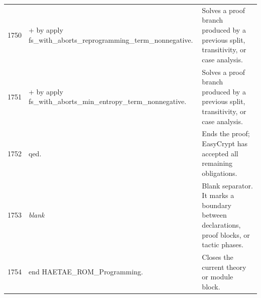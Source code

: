 \documentclass[10pt]{article}
\begin{document}
\begin{longtable}{r L{0.53\textwidth} L{0.37\textwidth}}
1750 & {\ttfamily\scriptsize + by apply fs\_with\_aborts\_reprogramming\_term\_nonnegative.} & Solves a proof branch produced by a previous split, transitivity, or case analysis. \\
1751 & {\ttfamily\scriptsize + by apply fs\_with\_aborts\_min\_entropy\_term\_nonnegative.} & Solves a proof branch produced by a previous split, transitivity, or case analysis. \\
1752 & {\ttfamily\scriptsize qed.} & Ends the proof; EasyCrypt has accepted all remaining obligations. \\
1753 & {\ttfamily\scriptsize \emph{blank}} & Blank separator.  It marks a boundary between declarations, proof blocks, or tactic phases. \\
1754 & {\ttfamily\scriptsize end HAETAE\_ROM\_Programming.} & Closes the current theory or module block. \\
\bottomrule
\end{longtable}
\end{document}
